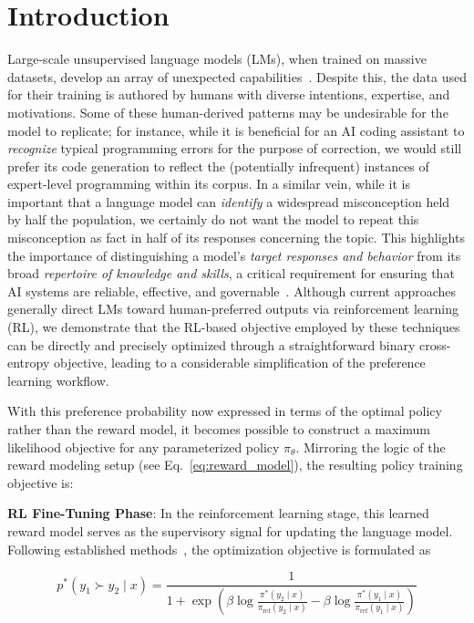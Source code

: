 \section{Introduction}
Large-scale unsupervised language models (LMs), when trained on massive datasets, develop an array of unexpected capabilities~\citep{chowdhery2022palm, brown2020language, touvron2023llama,bubeck2023sparks}. Despite this, the data used for their training is authored by humans with diverse intentions, expertise, and motivations. Some of these human-derived patterns may be undesirable for the model to replicate; for instance, while it is beneficial for an AI coding assistant to \textit{recognize} typical programming errors for the purpose of correction, we would still prefer its code generation to reflect the (potentially infrequent) instances of expert-level programming within its corpus. In a similar vein, while it is important that a language model can \textit{identify} a widespread misconception held by half the population, we certainly do not want the model to repeat this misconception as fact in half of its responses concerning the topic. This highlights the importance of distinguishing a model’s \emph{target responses and behavior} from its broad \textit{repertoire of knowledge and skills}, a critical requirement for ensuring that AI systems are reliable, effective, and governable~\citep{ouyang2022training}. Although current approaches generally direct LMs toward human-preferred outputs via reinforcement learning (RL), we demonstrate that the RL-based objective employed by these techniques can be directly and precisely optimized through a straightforward binary cross-entropy objective, leading to a considerable simplification of the preference learning workflow.

With this preference probability now expressed in terms of the optimal policy rather than the reward model, it becomes possible to construct a maximum likelihood objective for any parameterized policy $\pi_\theta$. Mirroring the logic of the reward modeling setup (see Eq.~\ref{eq:reward_model}), the resulting policy training objective is:

\textbf{RL Fine-Tuning Phase}: In the reinforcement learning stage, this learned reward model serves as the supervisory signal for updating the language model. Following established methods~\citep{jaques2017sequence, jaques2020human}, the optimization objective is formulated as

\begin{equation}\label{eq:objective}
    p^*(y_1\succ y_2 \mid x)=\frac{1}{1 + \exp\left(\beta \log \frac{\pi^*(y_2\mid x)}{\pi_\text{ref}(y_2\mid x)} - \beta \log \frac{\pi^*(y_1\mid x)}{\pi_\text{ref}(y_1\mid x)}\right)}
\end{equation}

